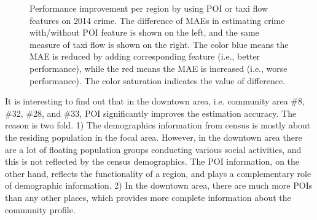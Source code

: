 \begin{figure}[h]
\centering
{}
\caption{Performance improvement per region by using POI or taxi flow features on 2014 crime. The difference of MAEs in estimating crime with/without POI feature is shown on the left, and the same measure of taxi flow is shown on the right. The color blue means the MAE is reduced by adding corresponding feature (i.e., better performance), while the red means the MAE is increased (i.e., worse performance). The color saturation indicates the value of difference.}
\label{fig:feat-area}
\end{figure}


It is interesting to find out that in the downtown area, i.e. community area \#8, \#32, \#28, and \#33, POI significantly improves the estimation accuracy. The reason is two fold. 1) The demographics information from census is mostly about the residing population in the focal area.  However, in the downtown area there are a lot of floating population groups conducting various social activities, and this is not reflected by the census demographics. The POI information, on the other hand, reflects the functionality of a region, and plays a complementary role of demographic information. 2) In the downtown area, there are much more POIs than any other places, which provides more complete information about the community profile.


